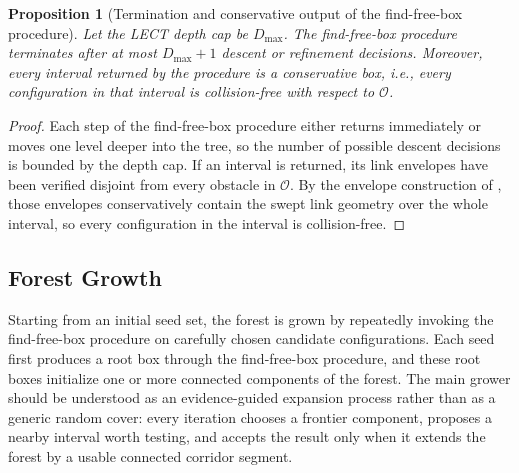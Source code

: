 \documentclass[journal]{IEEEtran}
\newtheorem{proposition}{Proposition}
\newcommand{\calO}{\ensuremath{\mathcal{O}}}
\begin{document}
\begin{proposition}[Termination and conservative output of the find-free-box procedure]
\label{prop:ffb_rewrite}
Let the LECT depth cap be $D_{\max}$. The find-free-box procedure terminates
after at most $D_{\max}+1$ descent or refinement decisions. Moreover, every
interval returned by the procedure is a conservative box, i.e., every
configuration in that interval is collision-free with respect to $\calO$.
\end{proposition}

\begin{proof}
Each step of the find-free-box procedure either returns immediately or moves
one level deeper into the tree, so the number of possible descent decisions
is bounded by the depth cap. If an interval is returned, its link envelopes
have been verified disjoint from every obstacle in $\calO$. By the envelope
construction of , those envelopes conservatively
contain the swept link geometry over the whole interval, so every configuration
in the interval is collision-free.
\end{proof}

\subsection{Forest Growth}\label{sec:forest_growth}

Starting from an initial seed set, the forest is grown by repeatedly invoking
the find-free-box procedure on carefully chosen candidate configurations.
Each seed first produces a root box through the find-free-box procedure, and
these root boxes initialize one or more connected components of the forest.
The main grower should be understood as an
evidence-guided expansion process rather than as a generic random cover:
every iteration chooses a frontier component, proposes a nearby interval worth
testing, and accepts the result only when it extends the forest by a usable
connected corridor segment.
\end{document}
